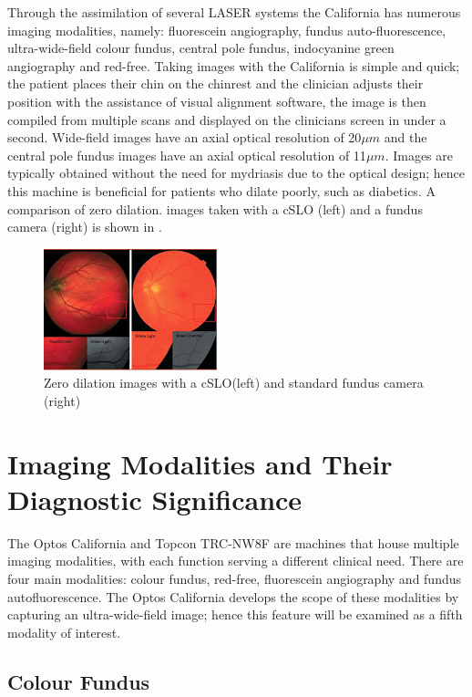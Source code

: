 Through the assimilation of several LASER systems the California
has numerous imaging modalities, namely: fluorescein angiography,
fundus auto-fluorescence, ultra-wide-field colour fundus, central pole
fundus, indocyanine green angiography and red-free.\cite{7_burnett_hodd_2012} Taking images with the California is simple and quick; the patient places
their chin on the chinrest and the clinician adjusts their position with the
assistance of visual alignment software, the image is then compiled
from multiple scans and displayed on the clinicians screen in under a second. Wide-field images have an axial optical resolution of 20$\mu m$ and the
central pole fundus images have an axial optical resolution of
11$\mu m$. Images are typically obtained without the need for mydriasis
due to the optical design; hence this machine is beneficial for patients who
dilate poorly, such as diabetics. A comparison of zero dilation.\cite{11_de_brouwere_2013} images taken with a cSLO (left)
and a fundus camera (right) is shown in . 

\begin{figure}[H]
\centering
\includegraphics{figures/zerodilation}
\caption{Zero dilation images with a cSLO(left) and standard fundus camera (right)\cite{11_de_brouwere_2013}}
\label{fig:zero}
   \end{figure}


\section{Imaging Modalities and Their Diagnostic Significance}

The Optos California and Topcon TRC-NW8F are machines that house
multiple imaging modalities, with each function serving a different clinical
need. There are four main modalities: colour fundus, red-free, fluorescein angiography and fundus autofluorescence. The Optos California develops
the scope of these modalities by capturing an ultra-wide-field image;
hence this feature will be examined as a fifth modality of interest.


\subsection{Colour Fundus}

